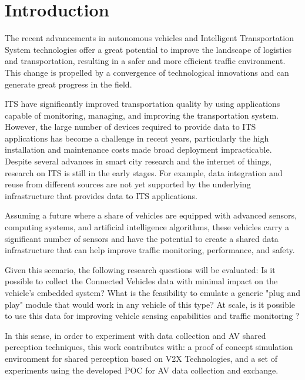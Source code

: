 \chapter{Introduction}
\label{cap_intr}

The recent advancements in autonomous vehicles and Intelligent Transportation System technologies offer a great potential to improve the landscape of logistics and transportation, resulting in a safer and more efficient traffic environment. This change is propelled by a convergence of technological innovations and can generate great progress in the field.

ITS have significantly improved transportation quality by using applications capable of monitoring, managing, and improving the transportation system. However, the large number of devices required to provide data to ITS applications has become a challenge in recent years, particularly the high installation and maintenance costs made broad deployment impracticable. Despite several advances in smart city research and the internet of things, research on ITS is still in the early stages. For example, data integration and reuse from different sources are not yet supported by the underlying infrastructure that provides data to ITS applications. 

Assuming a future where a share of vehicles are equipped with advanced sensors, computing systems, and artificial intelligence algorithms, these vehicles carry a significant number of sensors and have the potential to create a shared data infrastructure that can help improve traffic monitoring, performance, and safety.

Given this scenario, the following research questions will be evaluated: Is it possible to collect the Connected Vehicles data with minimal impact on the vehicle's embedded system? What is the feasibility to emulate a generic "plug and play" module that would work in any vehicle of this type? At scale, is it possible to use this data for improving vehicle sensing capabilities and traffic monitoring ?

In this sense, in order to experiment with data collection and AV shared perception techniques, this work contributes with: a proof of concept simulation environment for shared perception based on V2X Technologies, and a set of experiments using the developed POC for AV data collection and exchange. 


